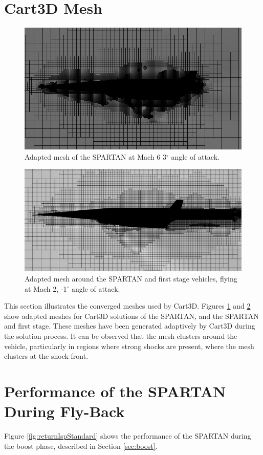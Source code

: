 \FloatBarrier
\section{Cart3D Mesh}
\begin{figure}[ht]
	\centering
	\includegraphics[width=0.7\linewidth]{figures/3_vehicle_design/M3AoA6GRID}
	\caption{Adapted mesh of the SPARTAN at Mach 6 3$^\circ$ angle of attack.}
	\label{fig:M3AoA6GRID}
\end{figure}

\begin{figure}[ht]
	\centering
	\includegraphics[width=0.7\linewidth]{figures/3_vehicle_design/CARTmesh}
	\caption{Adapted mesh around the SPARTAN and first stage vehicles, flying at Mach 2, -1$^\circ$ angle of attack.}
	\label{fig:CARTmesh}
\end{figure}
This section illustrates the converged meshes used by Cart3D.
Figures \ref{fig:M3AoA6GRID} and \ref{fig:CARTmesh} show adapted meshes for Cart3D solutions of the SPARTAN, and the SPARTAN and first stage. These meshes have been generated adaptively by Cart3D during the solution process. It can be observed that the mesh clusters around the vehicle, particularly in regions where strong shocks are present, where the mesh clusters at the shock front. 



\FloatBarrier
\section{Performance of the SPARTAN During Fly-Back}
Figure \ref{fig:returnIspStandard} shows the performance of the SPARTAN during the boost phase, described in Section \ref{sec:boost}. 

